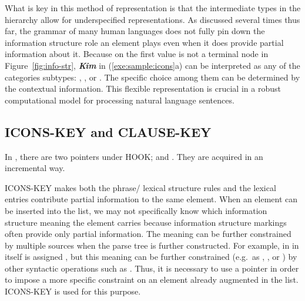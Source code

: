 What is key in this method of representation is that the intermediate
types in the hierarchy allow for underspecified representations. As
discussed several times thus far, the grammar of many human languages
does not fully pin down the information structure role an element
plays even when it does provide partial information about it. Because
 on the first  value is not a
terminal node in Figure~\ref{fig:info-str}, \textit{\textbf{Kim}} in
(\ref{exe:sample:icons}a) can be interpreted as any of the categories
subtypes: , ,
or .
The specific choice among them can be
determined by the contextual information.  This flexible
representation is crucial in a robust computational model for processing
natural language sentences.








\subsection{ICONS-KEY and CLAUSE-KEY}
\label{9:ssec:icons-key}


In , there are two pointers under HOOK; 
and . They are acquired in an incremental way.


ICONS-KEY makes both the phrase/ lexical structure rules and the
lexical entries contribute partial information to the same 
element.  When an  element can be inserted into the
 list, we may not specifically know which information
structure meaning the element carries because information structure
markings often provide only partial information.  The meaning can be
further constrained by multiple sources when the parse tree is further
constructed.  For example, \wa in  in itself is assigned
, but this meaning can be further constrained
(e.g.\ as , , or )
by other syntactic operations such as .  Thus, it is
necessary to use a pointer in order to impose a more specific
constraint on an  element already augmented in the
 list. ICONS-KEY is used for this
purpose.



